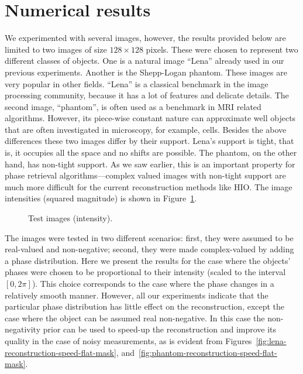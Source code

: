 \section{Numerical results}
\label{sec:numerical-results}
We experimented with several images, however, the results provided
below are limited to two images of size $128\times 128$ pixels. These
were chosen to represent two different classes of objects. One is a
natural image ``Lena''  already used in our previous
experiments. Another is the Shepp-Logan phantom.  These images are
very popular in other fields. ``Lena'' is a classical benchmark in the
image processing community, because it has a lot of features and
delicate details. The second image, ``phantom'', is often used as a
benchmark in MRI related algorithms. However, its piece-wise constant
nature can approximate well objects that are often investigated in
microscopy, for example, cells. Besides the above differences these two
images differ by their support. Lena's support is tight, that is, it
occupies all the space and no shifts are possible. The phantom, on the
other hand, has non-tight support. As we saw earlier, this is an
important property for phase retrieval algorithms---complex valued
images with non-tight support are much more difficult for the current
reconstruction methods like HIO. The image intensities (squared
magnitude) is shown in Figure~\ref{fig:boundary-test-images}.
\begin{figure}[H]
  \centering
  \qquad{}
  \caption[Test images]{Test images (intensity).}
  \label{fig:boundary-test-images}
\end{figure}
The images were tested in two different scenarios: first, they were
assumed to be real-valued and non-negative; second, they were made
complex-valued by adding a phase distribution. Here we present the
results for the case where the objects' phases were chosen to be
proportional to their intensity (scaled to the interval
$[0,2\pi]$). This choice corresponds to the case where the phase
changes in a relatively smooth manner.  However, all our experiments
indicate that the particular phase distribution has little effect on
the reconstruction, except the case where the object can be assumed
real non-negative. In this case the non-negativity prior can be used
to speed-up the reconstruction and improve its quality in the case of
noisy measurements, as is evident from
Figures~\ref{fig:lena-reconstruction-speed-flat-mask},
and~\ref{fig:phantom-reconstruction-speed-flat-mask}. 

